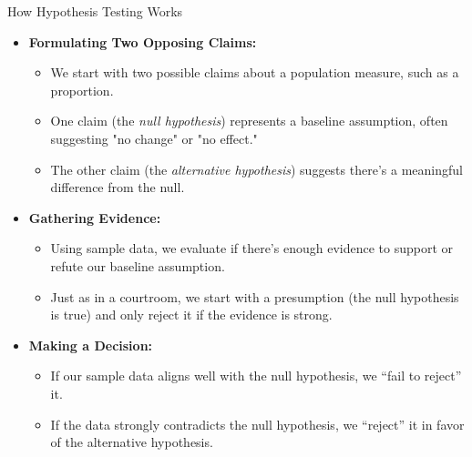 \documentclass[handout]{beamer} %
\begin{document}
\begin{frame}{How Hypothesis Testing Works}
    \begin{itemize}
        \item \textbf{Formulating Two Opposing Claims:}
        \begin{itemize}
            \item We start with two possible claims about a population measure, such as a proportion.
            \item One claim (the \textit{null hypothesis}) represents a baseline assumption, often suggesting "no change" or "no effect."
            \item The other claim (the \textit{alternative hypothesis}) suggests there’s a meaningful difference from the null.
        \end{itemize}
        
        \item \textbf{Gathering Evidence:} 
        \begin{itemize}
            \item Using sample data, we evaluate if there’s enough evidence to support or refute our baseline assumption.
            \item Just as in a courtroom, we start with a presumption (the null hypothesis is true) and only reject it if the evidence is strong.
        \end{itemize}
        
        \item \textbf{Making a Decision:}
        \begin{itemize}
            \item If our sample data aligns well with the null hypothesis, we “fail to reject” it.
            \item If the data strongly contradicts the null hypothesis, we “reject” it in favor of the alternative hypothesis.
        \end{itemize}
    \end{itemize}
\end{frame}
\end{document}
